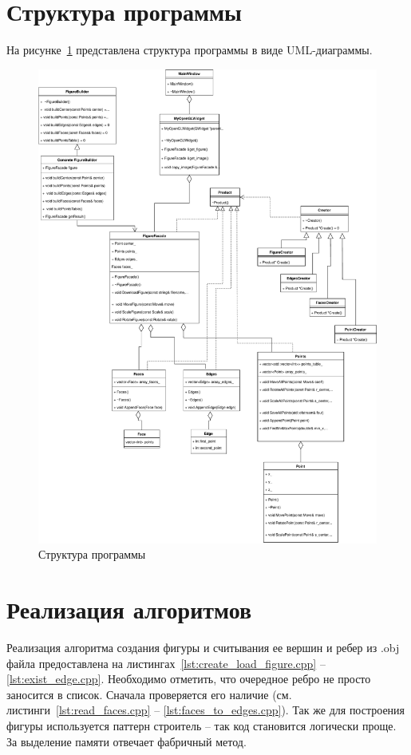 \section{Структура программы}
На рисунке~\ref{fig:uml_programm} представлена структура программы в виде UML-диаграммы.

\begin{figure}[H]
	\centering
	\includegraphics[scale=0.54]{images/programm.pdf}
	\caption{Структура программы}
	\label{fig:uml_programm}
\end{figure}

\newpage

\section{Реализация алгоритмов}
Реализация алгоритма создания фигуры и считывания ее вершин и ребер из .obj файла предоставлена на листингах~\ref{lst:create_load_figure.cpp} -- \ref{lst:exist_edge.cpp}.
Необходимо отметить, что очередное ребро не просто заносится в список. 
Сначала проверяется его наличие (см. листинги~\ref{lst:read_faces.cpp} -- \ref{lst:faces_to_edges.cpp}).
Так же для построения фигуры используется паттерн строитель – так код становится логически проще.
За выделение памяти отвечает фабричный метод.

